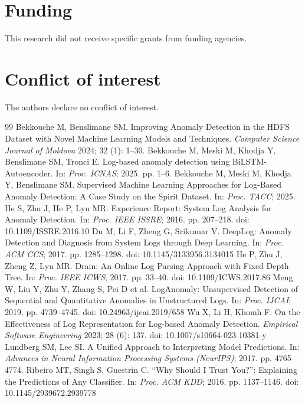 \documentclass{elektr}
\begin{document}
\section*{Funding}
This research did not receive specific grants from funding agencies.

\section*{Conflict of interest}
The authors declare no conflict of interest.

\begin{thebibliography}{99}
\small
\setlength{\itemsep}{1pt}
 Bekkouche M, Benslimane SM. Improving Anomaly Detection in the HDFS Dataset with Novel Machine Learning Models and Techniques. \textit{Computer Science Journal of Moldova} 2024; 32 (1): 1--30.
 Bekkouche M, Meski M, Khodja Y, Benslimane SM, Tronci E. Log-based anomaly detection using BiLSTM-Autoencoder. In: \textit{Proc. ICNAS}; 2025. pp. 1--6.
 Bekkouche M, Meski M, Khodja Y, Benslimane SM. Supervised Machine Learning Approaches for Log-Based Anomaly Detection: A Case Study on the Spirit Dataset. In: \textit{Proc. TACC}; 2025.
 He S, Zhu J, He P, Lyu MR. Experience Report: System Log Analysis for Anomaly Detection. In: \textit{Proc. IEEE ISSRE}; 2016. pp. 207--218. doi: 10.1109/ISSRE.2016.10
 Du M, Li F, Zheng G, Srikumar V. DeepLog: Anomaly Detection and Diagnosis from System Logs through Deep Learning. In: \textit{Proc. ACM CCS}; 2017. pp. 1285--1298. doi: 10.1145/3133956.3134015
 He P, Zhu J, Zheng Z, Lyu MR. Drain: An Online Log Parsing Approach with Fixed Depth Tree. In: \textit{Proc. IEEE ICWS}; 2017. pp. 33--40. doi: 10.1109/ICWS.2017.86
 Meng W, Liu Y, Zhu Y, Zhang S, Pei D et al. LogAnomaly: Unsupervised Detection of Sequential and Quantitative Anomalies in Unstructured Logs. In: \textit{Proc. IJCAI}; 2019. pp. 4739--4745. doi: 10.24963/ijcai.2019/658
 Wu X, Li H, Khomh F. On the Effectiveness of Log Representation for Log-based Anomaly Detection. \textit{Empirical Software Engineering} 2023; 28 (6): 137. doi: 10.1007/s10664-023-10381-y
 Lundberg SM, Lee SI. A Unified Approach to Interpreting Model Predictions. In: \textit{Advances in Neural Information Processing Systems (NeurIPS)}; 2017. pp. 4765--4774.
 Ribeiro MT, Singh S, Guestrin C. ``Why Should I Trust You?'': Explaining the Predictions of Any Classifier. In: \textit{Proc. ACM KDD}; 2016. pp. 1137--1146. doi: 10.1145/2939672.2939778

\end{thebibliography}
\end{document}
